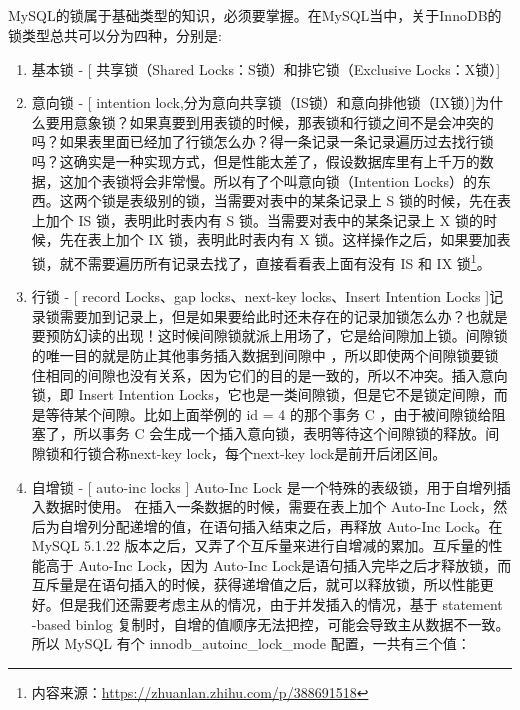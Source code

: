 \documentclass[../../../interview-questions.tex]{subfiles}
\begin{document}
\subsection{\color{red}{MySQL锁}}

MySQL的锁属于基础类型的知识，必须要掌握。在MySQL当中，关于InnoDB的锁类型总共可以分为四种，分别是:

\begin{enumerate}
    \item{基本锁 - [ 共享锁（Shared Locks：S锁）和排它锁（Exclusive Locks：X锁）]}
    \item{意向锁 - [ intention lock,分为意向共享锁（IS锁）和意向排他锁（IX锁）]}为什么要用意象锁？如果真要到用表锁的时候，那表锁和行锁之间不是会冲突的吗？如果表里面已经加了行锁怎么办？得一条记录一条记录遍历过去找行锁吗？这确实是一种实现方式，但是性能太差了，假设数据库里有上千万的数据，这加个表锁将会非常慢。所以有了个叫意向锁（Intention Locks）的东西。这两个锁是表级别的锁，当需要对表中的某条记录上 S 锁的时候，先在表上加个 IS 锁，表明此时表内有 S 锁。当需要对表中的某条记录上 X 锁的时候，先在表上加个 IX 锁，表明此时表内有 X 锁。这样操作之后，如果要加表锁，就不需要遍历所有记录去找了，直接看看表上面有没有 IS 和 IX 锁\footnote{内容来源：\url{https://zhuanlan.zhihu.com/p/388691518}}。
    \item{行锁 - [ record Locks、gap locks、next-key locks、Insert Intention Locks ]}记录锁需要加到记录上，但是如果要给此时还未存在的记录加锁怎么办？也就是要预防幻读的出现！这时候间隙锁就派上用场了，它是给间隙加上锁。间隙锁的唯一目的就是防止其他事务插入数据到间隙中 ，所以即使两个间隙锁要锁住相同的间隙也没有关系，因为它们的目的是一致的，所以不冲突。插入意向锁，即 Insert Intention Locks，它也是一类间隙锁，但是它不是锁定间隙，而是等待某个间隙。比如上面举例的 id = 4 的那个事务 C ，由于被间隙锁给阻塞了，所以事务 C 会生成一个插入意向锁，表明等待这个间隙锁的释放。间隙锁和行锁合称next-key lock，每个next-key lock是前开后闭区间。
    \item{自增锁 - [ auto-inc locks ] }Auto-Inc Lock 是一个特殊的表级锁，用于自增列插入数据时使用。 在插入一条数据的时候，需要在表上加个 Auto-Inc Lock，然后为自增列分配递增的值，在语句插入结束之后，再释放 Auto-Inc Lock。在 MySQL 5.1.22 版本之后，又弄了个互斥量来进行自增减的累加。互斥量的性能高于 Auto-Inc Lock，因为 Auto-Inc Lock是语句插入完毕之后才释放锁，而互斥量是在语句插入的时候，获得递增值之后，就可以释放锁，所以性能更好。但是我们还需要考虑主从的情况，由于并发插入的情况，基于 statement -based binlog 复制时，自增的值顺序无法把控，可能会导致主从数据不一致。所以 MySQL 有个 innodb\_autoinc\_lock\_mode 配置，一共有三个值：
    

\end{enumerate}
\end{document}
